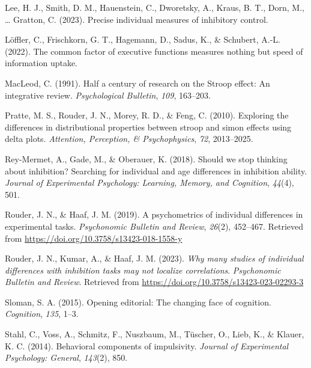 \documentclass[
  man,floatsintext]{apa6}
\newlength{\cslhangindent}
\newlength{\cslentryspacingunit} %
\newenvironment{CSLReferences}[2] %
 {%
  \setlength{\parindent}{0pt}
  \ifodd #1
  \let\oldpar\par
  \def\par{\hangindent=\cslhangindent\oldpar}
  \fi
  \setlength{\parskip}{#2\cslentryspacingunit}
 }%
 {}
\begin{document}
\begin{CSLReferences}{1}{0}
\leavevmode{}%
Lee, H. J., Smith, D. M., Hauenstein, C., Dworetsky, A., Kraus, B. T., Dorn, M., \ldots{} Gratton, C. (2023). Precise individual measures of inhibitory control.

\leavevmode{}%
Löffler, C., Frischkorn, G. T., Hagemann, D., Sadus, K., \& Schubert, A.-L. (2022). The common factor of executive functions measures nothing but speed of information uptake.

\leavevmode{}%
MacLeod, C. (1991). Half a century of research on the {S}troop effect: {A}n integrative review. \emph{Psychological Bulletin}, \emph{109}, 163--203.

\leavevmode{}%
Pratte, M. S., Rouder, J. N., Morey, R. D., \& Feng, C. (2010). Exploring the differences in distributional properties between stroop and simon effects using delta plots. \emph{Attention, Perception, \& Psychophysics}, \emph{72}, 2013--2025.

\leavevmode{}%
Rey-Mermet, A., Gade, M., \& Oberauer, K. (2018). Should we stop thinking about inhibition? Searching for individual and age differences in inhibition ability. \emph{Journal of Experimental Psychology: Learning, Memory, and Cognition}, \emph{44}(4), 501.

\leavevmode{}%
Rouder, J. N., \& Haaf, J. M. (2019). A psychometrics of individual differences in experimental tasks. \emph{Psychonomic Bulletin and Review}, \emph{26}(2), 452--467. Retrieved from \url{https://doi.org/10.3758/s13423-018-1558-y}

\leavevmode{}%
Rouder, J. N., Kumar, A., \& Haaf, J. M. (2023). \emph{Why many studies of individual differences with inhibition tasks may not localize correlations}. \emph{Psychonomic Bulletin and Review}. Retrieved from \url{https://doi.org/10.3758/s13423-023-02293-3}

\leavevmode{}%
Sloman, S. A. (2015). Opening editorial: The changing face of cognition. \emph{Cognition}, \emph{135}, 1--3.

\leavevmode{}%
Stahl, C., Voss, A., Schmitz, F., Nuszbaum, M., Tüscher, O., Lieb, K., \& Klauer, K. C. (2014). Behavioral components of impulsivity. \emph{Journal of Experimental Psychology: General}, \emph{143}(2), 850.


\end{CSLReferences}
\end{document}
